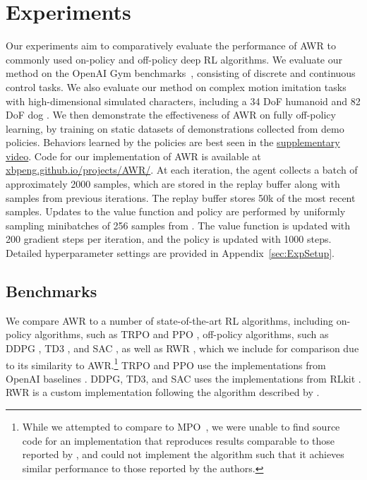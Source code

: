 \documentclass{article} \usepackage{iclr2020_conference,times}
\begin{document}
\section{Experiments}
\label{sec:Experiments}
Our experiments aim to comparatively evaluate the performance of AWR to commonly used on-policy and off-policy deep RL algorithms. We evaluate our method on the OpenAI Gym benchmarks~\citep{OpenAIGym}, consisting of discrete and continuous control tasks. We also evaluate our method on complex motion imitation tasks with high-dimensional simulated characters, including a 34 DoF humanoid and 82 DoF dog \citep{2018-TOG-deepMimic}. We then demonstrate the effectiveness of AWR on fully off-policy learning, by training on static datasets of demonstrations collected from demo policies. Behaviors learned by the policies are best seen in the \href{https://xbpeng.github.io/projects/AWR/}{supplementary video}.
Code for our implementation of AWR is available at \href{https://xbpeng.github.io/projects/AWR/}{xbpeng.github.io/projects/AWR/}. At each iteration, the agent collects a batch of approximately 2000 samples, which are stored in the replay buffer  along with samples from previous iterations. The replay buffer stores 50k of the most recent samples. Updates to the value function and policy are performed by uniformly sampling minibatches of 256 samples from . The value function is updated with 200 gradient steps per iteration, and the policy is updated with 1000 steps. Detailed hyperparameter settings are provided in Appendix~\ref{sec:ExpSetup}.

\subsection{Benchmarks}
We compare AWR to a number of state-of-the-art RL algorithms, including on-policy algorithms, such as TRPO \citep{TRPOschulman15} and PPO \citep{PPOSchulmanWDRK17}, off-policy algorithms, such as DDPG \citep{DDPG2016}, TD3 \citep{fujimoto18a}, and SAC \citep{SAC18}, as well as RWR \citep{Peters2007RWR}, which we include for comparison due to its similarity to AWR.\footnote{While we attempted to compare to MPO~\citep{abdolmaleki2018maximum}, we were unable to find source code for an implementation that reproduces results comparable to those reported by \citet{abdolmaleki2018maximum}, and could not implement the algorithm such that it achieves similar performance to those reported by the authors.}
TRPO and PPO use the implementations from OpenAI baselines \citep{baselines}. DDPG, TD3, and SAC uses the implementations from RLkit \citep{rlkit}. RWR is a custom implementation following the algorithm described by \citet{Peters2007RWR}.
\end{document}
